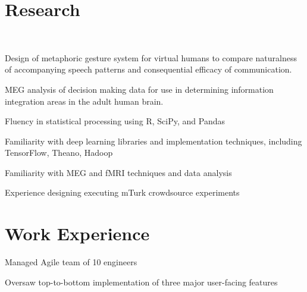 \documentclass[]{csaund_resume-openfont}
\begin{document}
\hfill
\begin{minipage}[t]{0.66\textwidth}



\section{Research}
 \\
\vspace{\topsep} %
\begin{tightemize}
\item Design of metaphoric gesture system for virtual humans to compare naturalness of accompanying speech patterns and consequential efficacy of communication.
\item MEG analysis of decision making data for use in determining information integration areas in the adult human brain.
\end{tightemize}
\sectionsep
{}
\begin{tightemize}
\item Fluency in statistical processing using R, SciPy, and Pandas
\item Familiarity with deep learning libraries and implementation techniques, including TensorFlow, Theano, Hadoop
\item Familiarity with MEG and fMRI techniques and data analysis
\item Experience designing executing mTurk crowdsource experiments
\end{tightemize}
\sectionsep


\section{Work Experience}

\begin{tightemize}
\item Managed Agile team of 10 engineers 
\item Oversaw top-to-bottom implementation of three major user-facing features
\end{tightemize}


\end{minipage}
\end{document}
